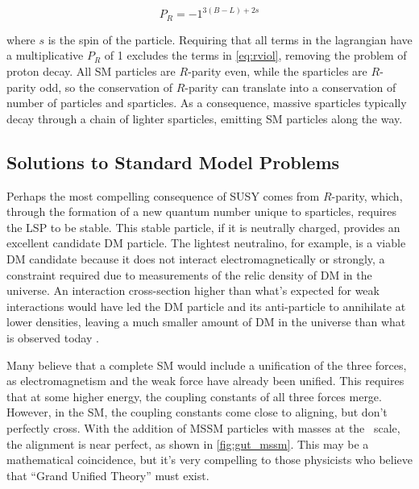 \begin{equation}
P_R = -1^{3(B-L)+2s}
\end{equation}

where $s$ is the spin of the particle. Requiring that all terms in the lagrangian have a multiplicative $P_R$ of 1 excludes the terms in \autoref{eq:rviol}, removing the problem of proton decay. All \ac{SM} particles are $R$-parity even, while the sparticles are $R$-parity odd, so the conservation of $R$-parity can translate into a conservation of number of particles and sparticles. As a consequence, massive sparticles typically decay through a chain of lighter sparticles, emitting \ac{SM} particles along the way.  

\subsection{Solutions to Standard Model Problems}

Perhaps the most compelling consequence of \ac{SUSY} comes from $R$-parity, which, through the formation of a new quantum number unique to sparticles, requires the \acf{LSP} to be stable. This stable particle, if it is neutrally charged, provides an excellent candidate \ac{DM} particle. The lightest neutralino, for example, is a viable \ac{DM} candidate because it does not interact electromagnetically or strongly, a constraint required due to measurements of the relic density of \ac{DM} in the universe. An interaction cross-section higher than what's expected for weak interactions would have led the \ac{DM} particle and its anti-particle to annihilate at lower densities, leaving a much smaller amount of \ac{DM} in the universe than what is observed today \cite{astro-ph/9407006}.

Many believe that a complete \ac{SM} would include a unification of the three forces, as electromagnetism and the weak force have already been unified. This requires that at some higher energy, the coupling constants of all three forces merge. However, in the \ac{SM}, the coupling constants come close to aligning, but don't perfectly cross. With the addition of \ac{MSSM} particles with masses at the \tev~scale, the alignment is near perfect, as shown in \autoref{fig:gut_mssm}. This may be a mathematical coincidence, but it's very compelling to those physicists who believe that ``Grand Unified Theory'' must exist. 

